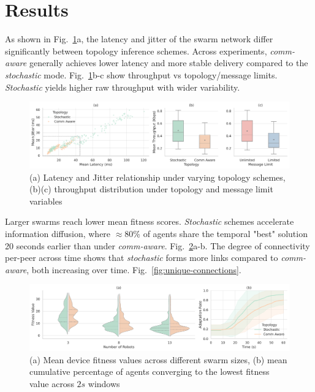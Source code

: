 \documentclass[conference]{IEEEtran}
\begin{document}
\section{Results}\label{sec:results}

As shown in Fig.~\ref{fig:topology}a, the latency and jitter of the swarm network differ significantly between topology inference schemes. Across experiments, \emph{comm-aware} generally achieves lower latency and more stable delivery compared to the \emph{stochastic} mode. Fig.~\ref{fig:topology}b-c show throughput vs topology/message limits. \emph{Stochastic} yields higher raw throughput with wider variability. \\

\begin{figure}[h]
    \centering
    \includegraphics[width=1\textwidth]{topology_impact.pdf}
    \caption{(a) Latency and Jitter relationship under varying topology schemes, (b)(c) throughput distribution under topology and message limit variables}
    \label{fig:topology}
\end{figure}

Larger swarms reach lower mean fitness scores. \emph{Stochastic} schemes accelerate information diffusion, where $\approx$80\% of agents share the temporal "best" solution 20 seconds earlier than under \emph{comm-aware}. Fig.~\ref{fig:performance}a-b. The degree of connectivity per-peer across time shows that \emph{stochastic} forms more links compared to \emph{comm-aware}, both increasing over time. Fig.~\ref{fig:unique-connections}. \\

\begin{figure}[h]
    \centering
    \includegraphics[width=1\textwidth]{performance_impact.pdf}
    \caption{(a) Mean device fitness values across different swarm sizes, (b) mean cumulative percentage of agents converging to the lowest fitness value across $2s$ windows}
    \label{fig:performance}
\end{figure}
\end{document}
